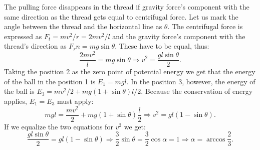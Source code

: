 {\ifEngSolution
The pulling force disappears in the thread if gravity force’s component with the same direction as the thread gets equal to centrifugal force. Let us mark the angle between the thread and the horizontal line as $\theta$. The centrifugal force is expressed as $F_t=mv^2/r=2mv^2/l$ and the gravity force’s component with the thread’s direction as $F_rn=mg\sin\theta$. These have to be equal, thus:
$$\frac{2mv^2}{l}=mg\sin\theta \Rightarrow v^2=\frac{gl\sin\theta}{2}.$$ 
Taking the position 2 as the zero point of potential energy we get that the energy of the ball in the position 1 is $E_1=mgl$. In the position 3, however, the energy of the ball is $E_3=mv^2/2+mg(1+\sin\theta)l/2$. Because the conservation of energy applies, $E_1=E_3$ must apply:
$$mgl=\frac{mv^2}{2}+mg(1+\sin\theta)\frac{l}{2} \Rightarrow v^2=gl(1-\sin\theta).$$ 
If we equalize the two equations for $v^2$ we get:
$$\frac{gl\sin\theta}{2}=gl(1-\sin\theta)\Rightarrow \frac{3}{2}\sin\theta=\frac{3}{2}\cos\alpha=1 \Rightarrow \alpha=\arccos\frac{2}{3}.$$
\fi
}